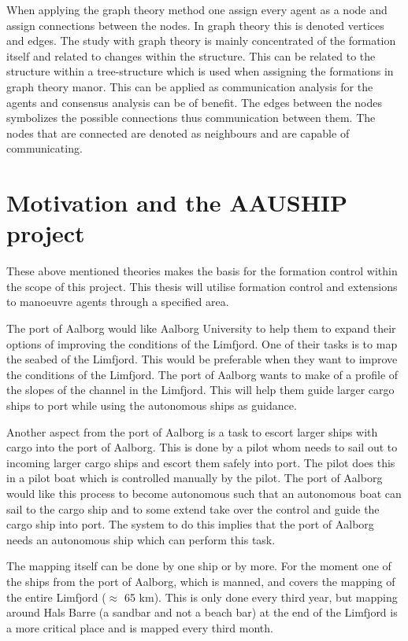 \begin{description}[style=nextline]
	\item [Graph Theory Approaches]
	When applying the graph theory method one assign every agent as a node and assign connections between the nodes. In graph theory this is denoted vertices and edges. The study with graph theory is mainly concentrated of the formation itself and related to changes within the structure. This can be related to the structure within a tree-structure which is used when assigning the formations in graph theory manor. This can be applied as communication analysis for the agents and consensus analysis can be of benefit. The edges between the nodes symbolizes the possible connections thus communication between them. The nodes that are connected are denoted as neighbours and are capable of communicating.
\end{description}

\section{Motivation and the AAUSHIP project}
These above mentioned theories makes the basis for the formation control within the scope of this project. This thesis will utilise formation control and extensions to manoeuvre agents through a specified area.

The port of Aalborg would like Aalborg University to help them to expand their options of improving the conditions of the Limfjord. One of their tasks is to map the seabed of the Limfjord. This would be preferable when they want to improve the conditions of the Limfjord. The port of Aalborg wants to make of a profile of the slopes of the channel in the Limfjord. This will help them guide larger cargo ships to port while using the autonomous ships as guidance.

Another aspect from the port of Aalborg is a task to escort larger ships with cargo into the port of Aalborg. This is done by a pilot whom needs to sail out to incoming larger cargo ships and escort them safely into port. The pilot does this in a pilot boat which is controlled manually by the pilot. The port of Aalborg would like this process to become autonomous such that an autonomous boat can sail to the cargo ship and to some extend take over the control and guide the cargo ship into port. The system to do this implies that the port of Aalborg needs an autonomous ship which can perform this task.

The mapping itself can be done by one ship or by more. For the moment one of the ships from the port of Aalborg, which is manned, and covers the mapping of the entire Limfjord ($\approx$ 65 km). This is only done every third year, but mapping around Hals Barre (a sandbar and not a beach bar) at the end of the Limfjord is a more critical place and is mapped every third month.

